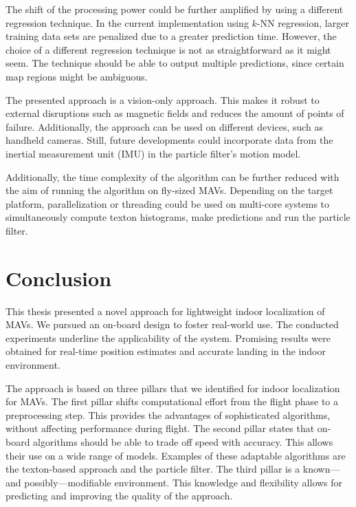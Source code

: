 \documentclass[11pt]{report}
\begin{document}
The shift of the processing power could be further amplified by using
a different regression technique. In the current implementation using
$k$-NN regression, larger training data sets are penalized due to a
greater prediction time. However, the choice of a different regression
technique is not as straightforward as it might seem. The technique
should be able to output multiple predictions, since certain map
regions might be ambiguous.

The presented approach is a vision-only approach. This makes it robust
to external disruptions such as magnetic fields and reduces the amount
of points of failure. Additionally, the approach can be used on
different devices, such as handheld cameras. Still, future
developments could incorporate data from the inertial measurement unit
(IMU) in the particle filter's motion model.

Additionally, the time complexity of the algorithm can be further
reduced with the aim of running the algorithm on fly-sized
MAVs. Depending on the target platform, parallelization or threading
could be used on multi-core systems to simultaneously compute texton
histograms, make predictions and run the particle filter.


\chapter{Conclusion}
\label{chap:conclusion}

This thesis presented a novel approach for lightweight indoor
localization of MAVs. We pursued an on-board design to foster
real-world use. The conducted experiments underline the applicability
of the system. Promising results were obtained for real-time position
estimates and accurate landing in the indoor environment.

The approach is based on three pillars that we identified for indoor
localization for MAVs. The first pillar shifts computational effort
from the flight phase to a preprocessing step. This provides the
advantages of sophisticated algorithms, without affecting performance
during flight. The second pillar states that on-board algorithms should
be able to trade off speed with accuracy. This allows their use on a
wide range of models. Examples of these adaptable algorithms are the
texton-based approach and the particle filter. The third pillar is a
known---and possibly---modifiable environment. This knowledge and
flexibility allows for predicting and improving the quality of the
approach.
\end{document}
